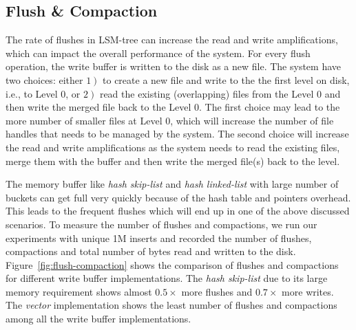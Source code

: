 \subsection{Flush \& Compaction}
 The rate of flushes in LSM-tree can increase the read and write amplifications, which can impact the overall performance of the system. 
For every flush operation, the write buffer is written to the disk as a new file. 
The system have two choices: either $\left. 1\right)$ to create a new file and write to the the first level on disk, i.e., to Level 0, or $\left. 2\right)$ read the existing (overlapping) files from the Level 0 and then write the merged file back to the Level 0.
The first choice may lead to the more number of smaller files at Level 0, which will increase the number of file handles that needs to be managed by the system.
The second choice will increase the read and write amplifications as the system needs to read the existing files, merge them with the buffer and then write the merged file(s) back to the level.

The memory buffer like \textit{hash skip-list} and \textit{hash linked-list} with large number of buckets can get full very quickly because of the hash table and pointers overhead. 
This leads to the frequent flushes which will end up in one of the above discussed scenarios. 
To measure the number of flushes and compactions, we run our experiments with unique 1M inserts and recorded the number of flushes, compactions and total number of bytes read and written to the disk.
Figure~\ref{fig:flush-compaction} shows the comparison of flushes and compactions for different write buffer implementations. The \textit{hash skip-list} due to its large memory requirement shows almost $0.5\times$ more 
flushes and $0.7\times$ more writes. The \textit{vector} implementation shows the least number of flushes and compactions among all the write buffer implementations.



